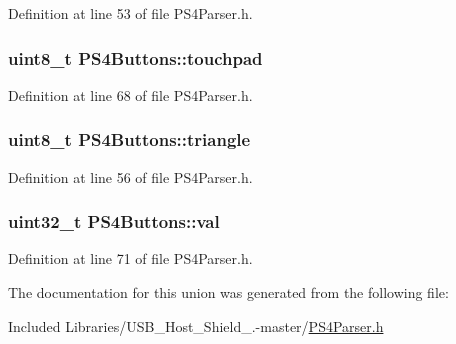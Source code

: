 \-Definition at line 53 of file \-P\-S4\-Parser.\-h.

\hypertarget{union_p_s4_buttons_a785305478e29a078003c360babb50ab0}{
\subsubsection[{touchpad}]{\setlength{\rightskip}{0pt plus 5cm}uint8\-\_\-t {\bf \-P\-S4\-Buttons\-::touchpad}}}\label{union_p_s4_buttons_a785305478e29a078003c360babb50ab0}


\-Definition at line 68 of file \-P\-S4\-Parser.\-h.

\hypertarget{union_p_s4_buttons_a72d07e9a47b1b75474e152b6aaeae6e5}{
\subsubsection[{triangle}]{\setlength{\rightskip}{0pt plus 5cm}uint8\-\_\-t {\bf \-P\-S4\-Buttons\-::triangle}}}\label{union_p_s4_buttons_a72d07e9a47b1b75474e152b6aaeae6e5}


\-Definition at line 56 of file \-P\-S4\-Parser.\-h.

\hypertarget{union_p_s4_buttons_aa381b471d6e5f1e36fa87048b0f8ddc9}{
\subsubsection[{val}]{\setlength{\rightskip}{0pt plus 5cm}uint32\-\_\-t {\bf \-P\-S4\-Buttons\-::val}}}\label{union_p_s4_buttons_aa381b471d6e5f1e36fa87048b0f8ddc9}


\-Definition at line 71 of file \-P\-S4\-Parser.\-h.



\-The documentation for this union was generated from the following file\-:\begin{DoxyCompactItemize}
\item 
\-Included Libraries/\-U\-S\-B\-\_\-\-Host\-\_\-\-Shield\-\_.-\/master/\hyperlink{_p_s4_parser_8h}{\-P\-S4\-Parser.\-h}\end{DoxyCompactItemize}
